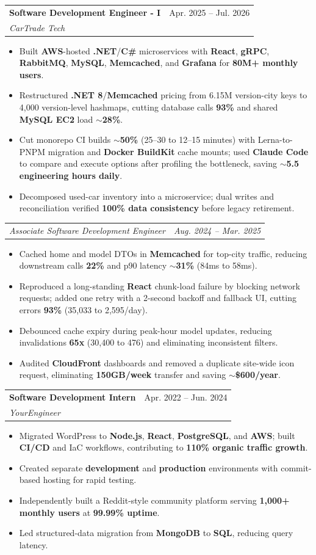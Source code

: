 \documentclass[letterpaper,11pt]{article}
\makeatletter
\newcommand{\resumeItem}[1]{
  \item\small{
    {#1 \vspace{-2pt}}
  }
}
\newcommand{\resumeSubheading}[4]{
  \vspace{-2pt}\item
    \begin{tabular*}{0.97\textwidth}[t]{l@{\extracolsep{\fill}}r}
      \textbf{#1} & #2 \\
      \textit{\small#3} & \textit{\small #4} \\
    \end{tabular*}\vspace{-7pt}
}
\newcommand{\resumeSubSubheading}[2]{
    \item
    \begin{tabular*}{0.97\textwidth}{l@{\extracolsep{\fill}}r}
      \textit{\small#1} & \textit{\small #2} \\
    \end{tabular*}\vspace{-7pt}
}
\newcommand{\resumeItemListStart}{\begin{itemize}}
\newcommand{\resumeItemListEnd}{\end{itemize}\vspace{-5pt}}
\makeatother
\begin{document}
\resumeSubheading
{Software Development Engineer - I}{Apr. 2025 -- Jul. 2026}
{CarTrade Tech}{ }
\resumeItemListStart
\resumeItem{Built \textbf{AWS}-hosted \textbf{.NET}/\textbf{C\#} microservices with \textbf{React}, \textbf{gRPC}, \textbf{RabbitMQ}, \textbf{MySQL}, \textbf{Memcached}, and \textbf{Grafana} for \textbf{80M+ monthly users}.}
\resumeItem{Restructured \textbf{.NET 8}/\textbf{Memcached} pricing from 6.15M version-city keys to 4,000 version-level hashmaps, cutting database calls \textbf{93\%} and shared \textbf{MySQL EC2} load \textbf{$\sim$28\%}.}
\resumeItem{Cut monorepo CI builds \textbf{$\sim$50\%} (25--30 to 12--15 minutes) with Lerna-to-PNPM migration and \textbf{Docker BuildKit} cache mounts; used \textbf{Claude Code} to compare and execute options after profiling the bottleneck, saving \textbf{$\sim$5.5 engineering hours daily}.}
\resumeItem{Decomposed used-car inventory into a microservice; dual writes and reconciliation verified \textbf{100\% data consistency} before legacy retirement.}
\resumeItemListEnd
\resumeSubSubheading
{Associate Software Development Engineer}{Aug. 2024 -- Mar. 2025}
\resumeItemListStart
\resumeItem{Cached home and model DTOs in \textbf{Memcached} for top-city traffic, reducing downstream calls \textbf{22\%} and p90 latency \textbf{$\sim$31\%} (84ms to 58ms).}
\resumeItem{Reproduced a long-standing \textbf{React} chunk-load failure by blocking network requests; added one retry with a 2-second backoff and fallback UI, cutting errors \textbf{93\%} (35,033 to 2,595/day).}
\resumeItem{Debounced cache expiry during peak-hour model updates, reducing invalidations \textbf{65x} (30,400 to 476) and eliminating inconsistent filters.}
\resumeItem{Audited \textbf{CloudFront} dashboards and removed a duplicate site-wide icon request, eliminating \textbf{150GB/week} transfer and saving \textbf{$\sim$\$600/year}.}
\resumeItemListEnd

\resumeSubheading
{Software Development Intern}{Apr. 2022 -- Jun. 2024}
{YourEngineer}{ }
\resumeItemListStart
\resumeItem{Migrated WordPress to \textbf{Node.js}, \textbf{React}, \textbf{PostgreSQL}, and \textbf{AWS}; built \textbf{CI/CD} and IaC workflows, contributing to \textbf{110\% organic traffic growth}.}
\resumeItem{Created separate \textbf{development} and \textbf{production} environments with commit-based hosting for rapid testing.}
\resumeItem{Independently built a Reddit-style community platform serving \textbf{1,000+ monthly users} at \textbf{99.99\% uptime}.}
\resumeItem{Led structured-data migration from \textbf{MongoDB} to \textbf{SQL}, reducing query latency.}
\resumeItemListEnd
\end{document}
